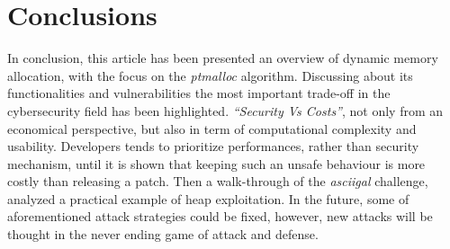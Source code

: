 \documentclass{article}
\numberwithin{equation}{subsection}
\begin{document}
\section{Conclusions}
In conclusion, this article has been presented an overview of dynamic memory allocation, with the focus on the \emph{ptmalloc} algorithm. Discussing about its functionalities and vulnerabilities the most important trade-off in the cybersecurity field has been highlighted. \textit{``Security Vs Costs''}, not only from an economical perspective, but also in term of computational complexity and usability.  Developers tends to prioritize performances, rather than security mechanism, until it is shown that keeping such an unsafe behaviour is more costly than releasing a patch. Then a walk-through of the \emph{asciigal} challenge, analyzed a practical example of heap exploitation. In the future, some of aforementioned attack strategies could be fixed, however, new attacks will be thought in the never ending game of attack and defense.
\clearpage
\tableofcontents
\clearpage
\listoffigures
\lstlistoflistings
\end{document}
